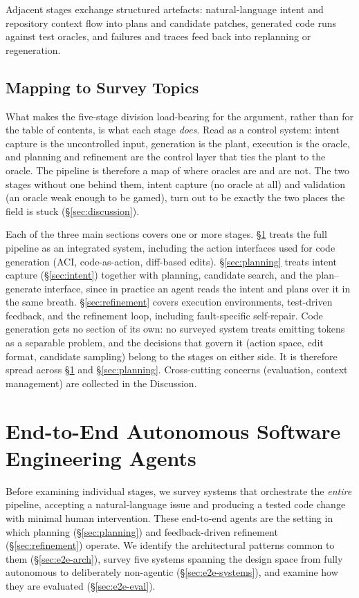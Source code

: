 \documentclass[
  english,        %
  font=times,     %
  twocolumn,      %
]{tumarticle}
\begin{document}
Adjacent stages exchange structured artefacts: natural-language intent and
repository context flow into plans and candidate patches, generated code runs
against test oracles, and failures and traces feed back into replanning or
regeneration.

\subsection{Mapping to Survey Topics}

What makes the five-stage division load-bearing for the argument, rather than for
the table of contents, is what each stage \emph{does}. Read as a control system:
intent capture is the uncontrolled input, generation is the plant, execution is
the oracle, and planning and refinement are the control layer that ties the plant
to the oracle. The pipeline is therefore a map of where oracles are and are not. The two stages
without one behind them, intent capture (no oracle at all) and validation (an
oracle weak enough to be gamed), turn out to be exactly the two places the field
is stuck (\S\ref{sec:discussion}).

Each of the three main sections covers one or more stages.
\S\ref{sec:e2e} treats the full pipeline as an integrated system, including the
action interfaces used for code generation (ACI, code-as-action, diff-based
edits). \S\ref{sec:planning} treats intent capture (\S\ref{sec:intent}) together
with planning, candidate search, and the plan--generate interface, since in
practice an agent reads the intent and plans over it in the same breath.
\S\ref{sec:refinement} covers execution environments, test-driven feedback, and
the refinement loop, including fault-specific self-repair. Code generation gets no
section of its own: no surveyed system treats emitting tokens as a separable
problem, and the decisions that govern it (action space, edit format, candidate
sampling) belong to the stages on either side. It is therefore spread across
\S\ref{sec:e2e} and \S\ref{sec:planning}. Cross-cutting concerns (evaluation,
context management) are collected in the Discussion.



\section{End-to-End Autonomous Software Engineering Agents}
\label{sec:e2e}

Before examining individual stages, we survey systems that orchestrate the
\emph{entire} pipeline, accepting a natural-language issue and producing a tested
code change with minimal human intervention. These end-to-end agents are the
setting in which planning (\S\ref{sec:planning}) and feedback-driven refinement
(\S\ref{sec:refinement}) operate. We identify the architectural patterns common to
them (\S\ref{sec:e2e-arch}), survey five systems spanning the design space from
fully autonomous to deliberately non-agentic (\S\ref{sec:e2e-systems}), and
examine how they are evaluated (\S\ref{sec:e2e-eval}).
\end{document}
